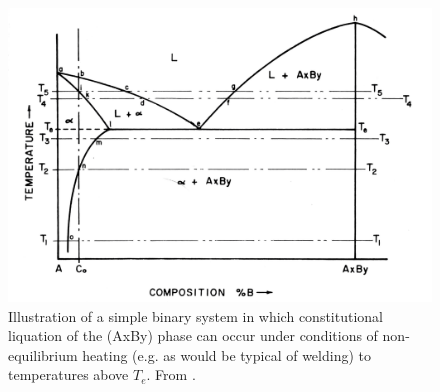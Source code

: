 \begin{figure}
    \includegraphics[width=6in]{figures/pepe-liquation-diagram.png}
    \caption{Illustration of a simple binary system in which constitutional liquation of the (AxBy) phase can occur under conditions of non-equilibrium heating (e.g. as would be typical of welding) to temperatures above $T_e$. From \citet{pepe_effects_1967}.}
    \label{pepe-liquation-diagram}
\end{figure}


